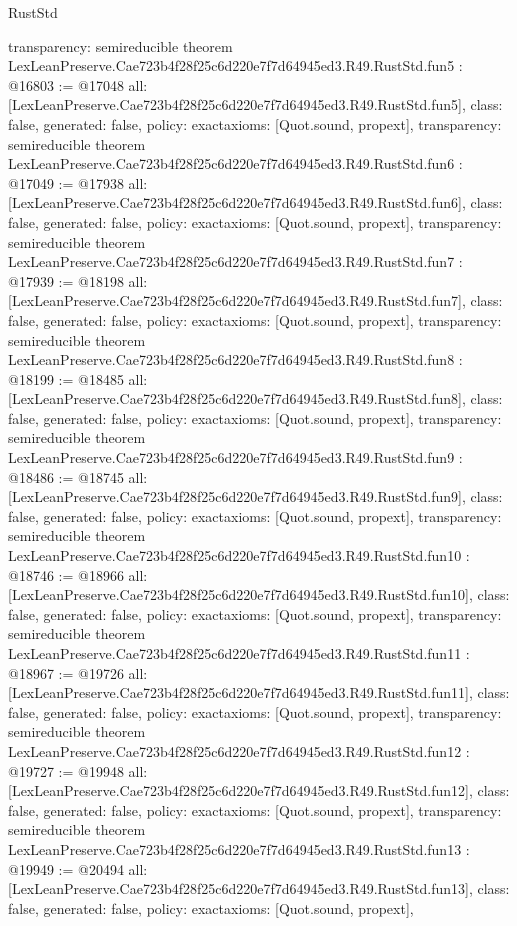 \begin{lexlean}{RustStd}
\begin{coremodule}
{  transparency: semireducible
}
theorem LexLeanPreserve.Cae723b4f28f25c6d220e7f7d64945ed3.R49.RustStd.fun5 : @16803 := @17048 {
  all: [LexLeanPreserve.Cae723b4f28f25c6d220e7f7d64945ed3.R49.RustStd.fun5],
  class: false,
  generated: false,
  policy: exact{axioms: [Quot.sound, propext]},
  transparency: semireducible
}
theorem LexLeanPreserve.Cae723b4f28f25c6d220e7f7d64945ed3.R49.RustStd.fun6 : @17049 := @17938 {
  all: [LexLeanPreserve.Cae723b4f28f25c6d220e7f7d64945ed3.R49.RustStd.fun6],
  class: false,
  generated: false,
  policy: exact{axioms: [Quot.sound, propext]},
  transparency: semireducible
}
theorem LexLeanPreserve.Cae723b4f28f25c6d220e7f7d64945ed3.R49.RustStd.fun7 : @17939 := @18198 {
  all: [LexLeanPreserve.Cae723b4f28f25c6d220e7f7d64945ed3.R49.RustStd.fun7],
  class: false,
  generated: false,
  policy: exact{axioms: [Quot.sound, propext]},
  transparency: semireducible
}
theorem LexLeanPreserve.Cae723b4f28f25c6d220e7f7d64945ed3.R49.RustStd.fun8 : @18199 := @18485 {
  all: [LexLeanPreserve.Cae723b4f28f25c6d220e7f7d64945ed3.R49.RustStd.fun8],
  class: false,
  generated: false,
  policy: exact{axioms: [Quot.sound, propext]},
  transparency: semireducible
}
theorem LexLeanPreserve.Cae723b4f28f25c6d220e7f7d64945ed3.R49.RustStd.fun9 : @18486 := @18745 {
  all: [LexLeanPreserve.Cae723b4f28f25c6d220e7f7d64945ed3.R49.RustStd.fun9],
  class: false,
  generated: false,
  policy: exact{axioms: [Quot.sound, propext]},
  transparency: semireducible
}
theorem LexLeanPreserve.Cae723b4f28f25c6d220e7f7d64945ed3.R49.RustStd.fun10 : @18746 := @18966 {
  all: [LexLeanPreserve.Cae723b4f28f25c6d220e7f7d64945ed3.R49.RustStd.fun10],
  class: false,
  generated: false,
  policy: exact{axioms: [Quot.sound, propext]},
  transparency: semireducible
}
theorem LexLeanPreserve.Cae723b4f28f25c6d220e7f7d64945ed3.R49.RustStd.fun11 : @18967 := @19726 {
  all: [LexLeanPreserve.Cae723b4f28f25c6d220e7f7d64945ed3.R49.RustStd.fun11],
  class: false,
  generated: false,
  policy: exact{axioms: [Quot.sound, propext]},
  transparency: semireducible
}
theorem LexLeanPreserve.Cae723b4f28f25c6d220e7f7d64945ed3.R49.RustStd.fun12 : @19727 := @19948 {
  all: [LexLeanPreserve.Cae723b4f28f25c6d220e7f7d64945ed3.R49.RustStd.fun12],
  class: false,
  generated: false,
  policy: exact{axioms: [Quot.sound, propext]},
  transparency: semireducible
}
theorem LexLeanPreserve.Cae723b4f28f25c6d220e7f7d64945ed3.R49.RustStd.fun13 : @19949 := @20494 {
  all: [LexLeanPreserve.Cae723b4f28f25c6d220e7f7d64945ed3.R49.RustStd.fun13],
  class: false,
  generated: false,
  policy: exact{axioms: [Quot.sound, propext]},
}
\end{coremodule}
\end{lexlean}
